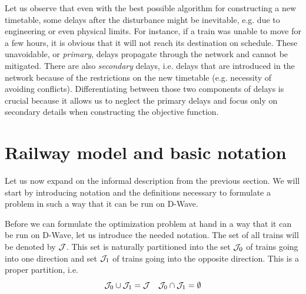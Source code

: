 Let us observe that even with the best possible algorithm for constructing a new timetable, some
delays after the disturbance might be inevitable, e.g. due to engineering or even physical limits.
For instance, if a train was unable to move for a few hours, it is obvious that it will not reach
its destination on schedule. These unavoidable, or \emph{primary}, delays propagate through the
network and cannot be mitigated. There are also \emph{secondary} delays, i.e. delays that are
introduced in the network because of the restrictions on the new timetable (e.g. necessity of
avoiding conflicts). Differentiating between those two components of delays is crucial because it
allows us to neglect the primary delays and focus only on secondary details when constructing the
objective function.

\section{Railway model and basic notation}
Let us now expand on the informal description from the previous section. We will start by introducing
notation and the definitions necessary to formulate a problem in such a way that it can be run on D-Wave.

Before we can formulate the optimization problem at hand in a way that it can be run on D-Wave, let
us introduce the needed notation. The set of all trains will be denoted by $\mathcal{J}$. This set is
naturally partitioned into the set $\mathcal{J}_0$ of trains going into one direction and set $\mathcal{J}_1$ of
trains going into the opposite direction. This is a proper partition, i.e.
\begin{equation}
	\mathcal{J}_0 \cup \mathcal{J}_1 = \mathcal{J} \quad \mathcal{J}_0 \cap \mathcal{J}_1 = \emptyset
\end{equation}

